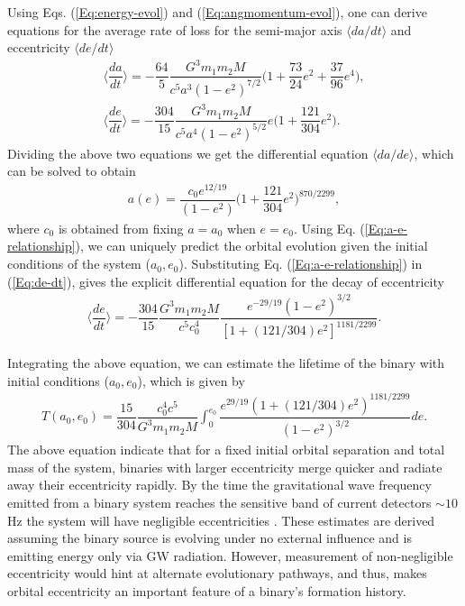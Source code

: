 Using Eqs. (\ref{Eq:energy-evol}) and (\ref{Eq:angmomentum-evol}), one can derive equations for the average rate of loss for the semi-major axis $\langle da/dt \rangle$ and eccentricity $\langle de/dt \rangle$
\begin{align}
    \langle \dfrac{da}{dt} \rangle = -\dfrac{64}{5}\dfrac{G^3m_1m_2M}{c^5a^3(1-e^2)^{7/2}}\Big(1+\dfrac{73}{24}e^2+\dfrac{37}{96}e^4\Big), \label{Eq:da-dt} \\
    \langle \dfrac{de}{dt} \rangle = -\dfrac{304}{15}\dfrac{G^3m_1m_2M}{c^5a^4(1-e^2)^{5/2}}e\Big( 1+\dfrac{121}{304}e^2\Big). \label{Eq:de-dt}
\end{align}
Dividing the above two equations we get the differential equation $\langle da/de \rangle$, which can be solved to obtain 
\begin{align}
    a(e) = \dfrac{c_0 e^{12/19}}{(1-e^2)}\Big( 1 + \dfrac{121}{304}e^2 \Big)^{870/2299},
    \label{Eq:a-e-relationship}
\end{align}
where $c_0$ is obtained from fixing $a=a_0$ when $e=e_0$. Using Eq. (\ref{Eq:a-e-relationship}), we can uniquely predict the orbital evolution given the initial conditions of the system ($a_0, e_0$). Substituting Eq. (\ref{Eq:a-e-relationship}) in (\ref{Eq:de-dt}), gives the explicit differential equation for the decay of eccentricity  
\begin{align}
    \langle \dfrac{de}{dt} \rangle = -\dfrac{304}{15} \dfrac{G^3m_1m_2M}{c^5c_0^4}\dfrac{e^{-29/19}(1-e^2)^{3/2}}{[1+(121/304)e^2]^{1181/2299}}.
\end{align}

Integrating the above equation, we can estimate the lifetime of the binary with initial conditions ($a_0, e_0$), which is given by 
\begin{align}
    T(a_0, e_0) = \dfrac{15}{304}\dfrac{c_0^4c^5}{G^3m_1 m_2M} \int_0^{e_0} \dfrac{e^{29/19}(1 + (121/304)e^2)^{1181/2299}}{(1-e^2)^{3/2}}de.
    \label{Eq:Decay-time-binary}
\end{align}
The above equation indicate that for a fixed initial orbital separation and total mass of the system, binaries with larger eccentricity merge quicker and radiate away their eccentricity rapidly. By the time the gravitational wave frequency emitted from a binary system reaches the sensitive band of current detectors $\sim 10$ Hz the system will have negligible eccentricities \cite{Belczynski:2001uc}. These estimates are derived assuming the binary source is evolving under no external influence and is emitting energy only via GW radiation. However, measurement of non-negligible eccentricity would hint at alternate evolutionary pathways, and thus, makes orbital eccentricity an important feature of a binary's formation history.      

